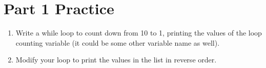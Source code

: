 \documentclass[letterpaper,10pt,english]{sphinxmanual}
\begin{document}
\section{Part 1 Practice}
\label{\detokenize{lecture_notes/lec09_loops1_while:part-1-practice}}\begin{enumerate}
\item {} 
Write a while loop to count down from 10 to 1, printing the values
of the loop counting variable  (it could be some other variable
name as well).

\item {} 
Modify your loop to print the values in the list  in
reverse order.

\end{enumerate}
\end{document}
